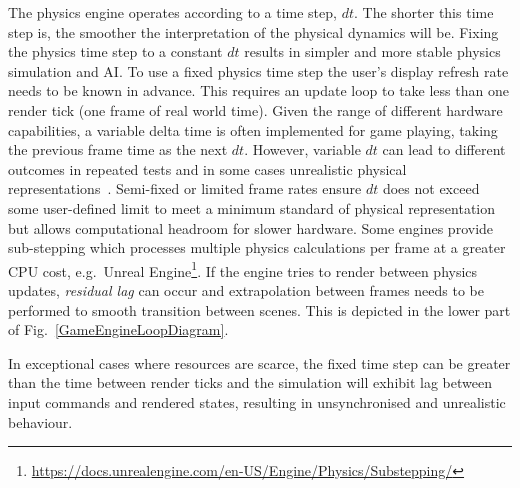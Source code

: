 \documentclass[letterpaper, 10 pt, journal, twoside]{IEEEtran}
\begin{document}
The physics engine operates according to a time step, $dt$. %
The shorter this time step is, the smoother the interpretation of the physical dynamics will be. %
%
Fixing the physics time step to a constant $dt$ results in simpler and more stable physics simulation and AI. 
%
To use a fixed physics time step the user's display refresh rate needs to be known in advance. This requires an update loop to take less than one render tick (one frame of real world time). Given the range of different hardware capabilities, a variable delta time is often implemented for game playing, taking the previous frame time as the next $dt$. However, variable $dt$ can lead to different outcomes in repeated tests and in some cases unrealistic physical representations~\cite{gaffer}. 
%
Semi-fixed or limited frame rates ensure $dt$ does not exceed some user-defined limit to meet a minimum standard of physical representation but allows computational headroom for slower hardware. Some engines provide sub-stepping which processes multiple physics calculations per frame at a greater CPU cost, e.g.\ Unreal Engine\footnote{\url{https://docs.unrealengine.com/en-US/Engine/Physics/Substepping/}}. 
%
If the engine tries to render between physics updates, \textit{residual lag} can occur and extrapolation between frames needs to be performed to smooth transition between scenes. This is depicted in the lower part of Fig.~\ref{GameEngineLoopDiagram}. 

%
In exceptional cases where resources are scarce, the fixed time step can be greater than the time between render ticks %
and the simulation will exhibit lag between input commands and rendered states, resulting in unsynchronised and unrealistic behaviour. 
\end{document}
